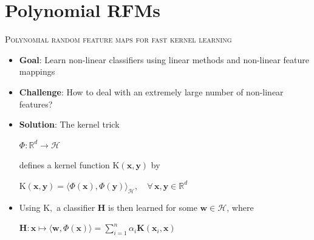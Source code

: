 \documentclass[xcolor=x11names,compress,ignorenonframetext,10pt]{beamer}
\renewcommand{\(}{\begin{columns}}
\renewcommand{\)}{\end{columns}}
\newcommand{\<}[1]{\begin{column}{#1}}
\renewcommand{\>}{\end{column}}
\begin{document}
\section{Polynomial RFMs}

\begin{frame}
\vfill
\begin{beamercolorbox}[center]{}
  \Large \textsc{Polynomial random feature maps for fast kernel learning}
\end{beamercolorbox}
\vfill
\end{frame}

\begin{frame}
\begin{itemize}
\item \textbf{Goal}: Learn non-linear classifiers using linear methods and non-linear feature mappings
\item \textbf{Challenge}: How to deal with an extremely large number of non-linear features?
\item \textbf{Solution}: The kernel trick\\
\begin{center}
$\Phi: \mathbb{R}^d \rightarrow \mathcal{H}$
\end{center}
defines a kernel function $\textrm{K}(\mathbf{x},\mathbf{y})$ by
\begin{center}
    $\textrm{K}(\mathbf{x},\mathbf{y}) = \langle \Phi(\mathbf{x}),\Phi(\mathbf{y}) \rangle_\mathcal{H}, \quad \forall\, \mathbf{x}, \mathbf{y} \in \mathbb{R}^d$
\end{center}

\item Using $\textrm{K},$ a classifier $\mathbf{H}$ is then learned for some $\mathbf{w} \in \mathcal{H}$, where 
\begin{center}
$\mathbf{H}: \mathbf{x} \mapsto \langle \mathbf{w}, \Phi(\mathbf{x})\rangle = \sum_{i=1}^n \alpha_i \mathbf{K}(\mathbf{x}_i, \mathbf{x})$
\end{center}
\end{itemize}
\end{frame}
\end{document}
